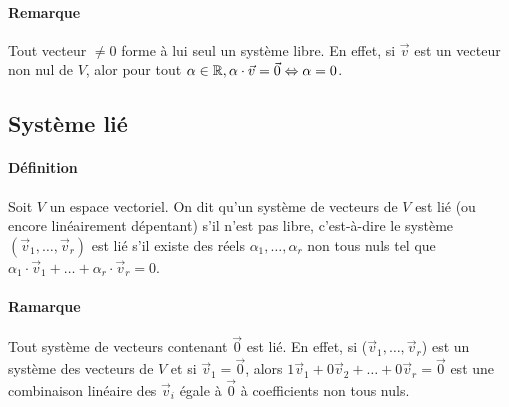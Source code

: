 \paragraph{Remarque} Tout vecteur $\neq 0$ forme à lui seul un système libre. En effet, si $\vec{v}$ est un vecteur non nul de $V$, alor pour tout $\alpha \in \mathbb{R},  \alpha \cdot \vec{v} = \vec{0} \Leftrightarrow \alpha = 0$.


%
\subsection{Système lié}
%
\paragraph{Définition} Soit $V$ un espace vectoriel. On dit qu'un système de vecteurs de $V$ est lié (ou encore linéairement dépentant) s'il n'est pas libre, c'est-à-dire le système $(\vec{v}_1, \ldots, \vec{v}_r)$ est lié s'il existe des réels $\alpha_1, \ldots, \alpha_r$ non tous nuls tel que $\alpha_1 \cdot \vec{v}_1 + \ldots + \alpha_r \cdot \vec{v}_r = 0$.
\paragraph{Ramarque} Tout système de vecteurs contenant $\vec{0}$ est lié. En effet, si ($\vec{v}_1, \dotsc, \vec{v}_r$) est un système des vecteurs de $V$ et si $\vec{v}_1=\vec{0}$, alors $1 \vec{v}_1+0 \vec{v}_2+\dotsc+0 \vec{v}_r=\vec{0}$ est une combinaison linéaire des $\vec{v}_i$ égale à $\vec{0}$ à coefficients non tous nuls.

